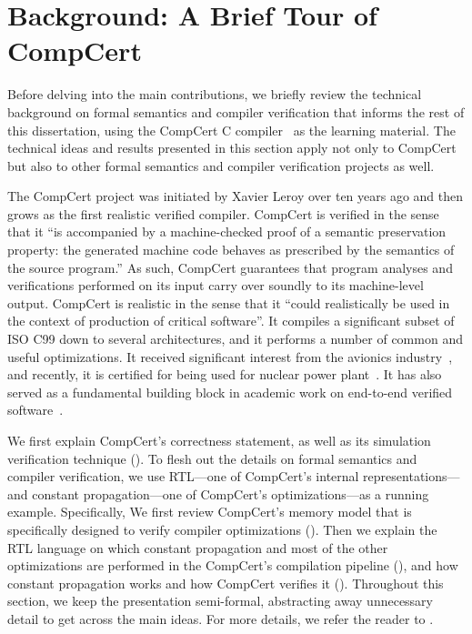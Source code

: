 \section{Background: A Brief Tour of CompCert}
\label{sec:background}

Before delving into the main contributions, we briefly review the technical background on formal
semantics and compiler verification that informs the rest of this dissertation, using the CompCert C
compiler~\cite{compcert} as the learning material.  The technical ideas and results presented in
this section apply not only to CompCert but also to other formal semantics and compiler verification
projects as well.

The CompCert project was initiated by Xavier Leroy over ten years ago and then grows as the first
realistic verified compiler.  CompCert is verified in the sense that it ``is accompanied by a
machine-checked proof of a semantic preservation property: the generated machine code behaves as
prescribed by the semantics of the source program.''  As such, CompCert guarantees that program
analyses and verifications performed on its input carry over soundly to its machine-level output.
CompCert is realistic in the sense that it ``could realistically be used in the context of
production of critical software''.  It compiles a significant subset of ISO C99 down to several
architectures, and it performs a number of common and useful optimizations.  It received significant
interest from the avionics industry~\cite{TODO}, and recently, it is certified for being used for
nuclear power plant~\cite{compcert-nuclear}.  It has also served as a fundamental building block in
academic work on end-to-end verified software~\cite{TODO}.

We first explain CompCert's correctness statement, as well as its simulation verification technique
().  To flesh out the details on formal semantics and compiler
verification, we use RTL---one of CompCert's internal representations---and constant
propagation---one of CompCert's optimizations---as a running example.  Specifically, We first review
CompCert's memory model that is specifically designed to verify compiler optimizations
().  Then we explain the RTL language on which constant propagation and
most of the other optimizations are performed in the CompCert's compilation pipeline
(), and how constant propagation works and how CompCert verifies it
().  Throughout this section, we keep the presentation semi-formal,
abstracting away unnecessary detail to get across the main ideas.  For more details, we refer the
reader to \cite{compcert, compcert-memory-model}.


